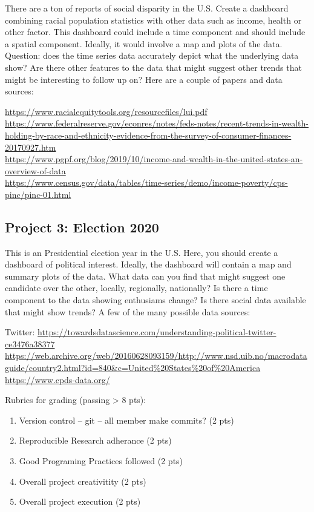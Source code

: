 \documentclass[]{article}
\providecommand{\tightlist}{%
  \setlength{\itemsep}{0pt}\setlength{\parskip}{0pt}}
\begin{document}
There are a ton of reports of social disparity in the U.S. Create a
dashboard combining racial population statistics with other data such as
income, health or other factor. This dashboard could include a time
component and should include a spatial component. Ideally, it would
involve a map and plots of the data. Question: does the time series data
accurately depict what the underlying data show? Are there other
features to the data that might suggest other trends that might be
interesting to follow up on? Here are a couple of papers and data
sources:

\url{https://www.racialequitytools.org/resourcefiles/lui.pdf}\\
\url{https://www.federalreserve.gov/econres/notes/feds-notes/recent-trends-in-wealth-holding-by-race-and-ethnicity-evidence-from-the-survey-of-consumer-finances-20170927.htm}~\\
\url{https://www.pgpf.org/blog/2019/10/income-and-wealth-in-the-united-states-an-overview-of-data}~\\
\url{https://www.census.gov/data/tables/time-series/demo/income-poverty/cps-pinc/pinc-01.html}

\hypertarget{project-3-election-2020}{%
\subsection{Project 3: Election 2020}\label{project-3-election-2020}}

This is an Presidential election year in the U.S. Here, you should
create a dashboard of political interest. Ideally, the dashboard will
contain a map and summary plots of the data. What data can you find that
might suggest one candidate over the other, locally, regionally,
nationally? Is there a time component to the data showing enthusiams
change? Is there social data available that might show trends? A few of
the many possible data sources:

Twitter:
\url{https://towardsdatascience.com/understanding-political-twitter-ce3476a38377}\\
\url{https://web.archive.org/web/20160628093159/http://www.nsd.uib.no/macrodataguide/country2.html?id=840\&c=United\%20States\%20of\%20America}
\url{https://www.cpds-data.org/}

Rubrics for grading (passing \textgreater{} 8 pts):

\begin{enumerate}
\def\labelenumi{\arabic{enumi}.}
\tightlist
\item
  Version control -- git -- all member make commits? (2 pts)
\item
  Reproducible Research adherance (2 pts)
\item
  Good Programing Practices followed (2 pts)
\item
  Overall project creativitity (2 pts)
\item
  Overall project execution (2 pts)
\end{enumerate}
\end{document}
